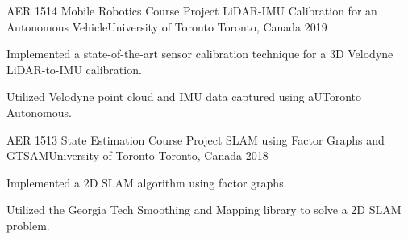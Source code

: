 

\begin{cventries}

  \cventry
    {AER 1514 Mobile Robotics Course Project} %
    {LiDAR-IMU Calibration for an Autonomous Vehicle{\enskip\cdotp\enskip}University of Toronto} %
    {Toronto, Canada} %
    {2019} %
    {
      \begin{cvitems} %
        \item {Implemented a state-of-the-art sensor calibration technique for a 3D Velodyne LiDAR-to-IMU calibration.}
        \item {Utilized Velodyne point cloud and IMU data captured using aUToronto Autonomous.}
      \end{cvitems}
    }
    
  \cventry
    {AER 1513 State Estimation Course Project} %
    {SLAM using Factor Graphs and GTSAM{\enskip\cdotp\enskip}University of Toronto} %
    {Toronto, Canada} %
    {2018} %
    {
      \begin{cvitems} %
        \item {Implemented a 2D SLAM algorithm using factor graphs.}
        \item {Utilized the Georgia Tech Smoothing and Mapping library to solve a 2D SLAM problem.}
      \end{cvitems}
    }

\end{cventries}
